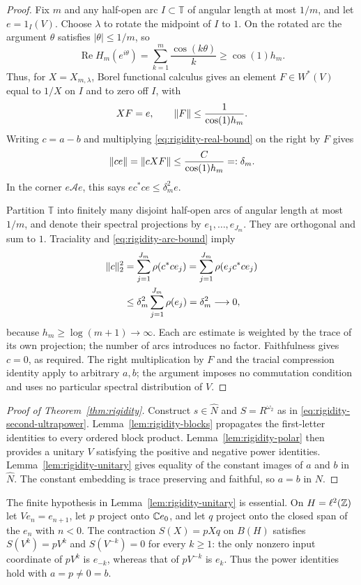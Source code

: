 \begin{proof}
Fix $m$ and any half-open arc $I\subset\mathbb T$ of angular length
at most $1/m$, and let $e=1_I(V)$.  Choose $\lambda$ to rotate the
midpoint of $I$ to $1$.  On the rotated arc the argument $\theta$
satisfies $|\theta|\leq1/m$, so
\[
 \operatorname{Re}H_m(e^{i\theta})
 =\sum_{k=1}^m\frac{\cos(k\theta)}k
 \geq\cos(1)h_m.
\]
Thus, for $X=X_{m,\lambda}$, Borel functional calculus gives an
element $F\in W^*(V)$ equal to $1/X$ on $I$ and to zero off $I$,
with
\[
 XF=e,\qquad
 \lVert F\rVert\leq\frac1{\cos(1)h_m}.
\]
Writing $c=a-b$ and multiplying \eqref{eq:rigidity-real-bound} on
the right by $F$ gives
\begin{equation}\label{eq:rigidity-arc-bound}
 \lVert ce\rVert=\lVert cXF\rVert
 \leq\frac{C}{\cos(1)h_m}=:\delta_m.
\end{equation}
In the corner $e\mathcal A e$, this says
$ec^*ce\leq\delta_m^2 e$.

Partition $\mathbb T$ into finitely many disjoint half-open arcs of
angular length at most $1/m$, and denote their spectral projections
by $e_1,\ldots,e_{J_m}$.  They are orthogonal and sum to $1$.
Traciality and \eqref{eq:rigidity-arc-bound} imply
\[
 \begin{split}
 \lVert c\rVert_2^2
 &=\sum_{j=1}^{J_m}\rho(c^*ce_j)
  =\sum_{j=1}^{J_m}\rho(e_jc^*ce_j)\\
 &\leq\delta_m^2\sum_{j=1}^{J_m}\rho(e_j)
  =\delta_m^2\longrightarrow0,
 \end{split}
\]
because $h_m\geq\log(m+1)\to\infty$.  Each arc estimate is weighted
by the trace of its own projection; the number of arcs introduces no
factor.  Faithfulness gives $c=0$, as required.  The right multiplication
by $F$ and the tracial compression identity apply to arbitrary $a,b$;
the argument imposes no commutation condition and uses no particular
spectral distribution of $V$.
\end{proof}

\begin{proof}[Proof of Theorem~\ref{thm:rigidity}]
Construct $s\in\widehat N$ and $S=R^{\omega_2}$ as in
\eqref{eq:rigidity-second-ultrapower}.
Lemma~\ref{lem:rigidity-blocks} propagates the first-letter identities
to every ordered block product.  Lemma~\ref{lem:rigidity-polar} then
provides a unitary $V$ satisfying the positive and negative power
identities.  Lemma~\ref{lem:rigidity-unitary} gives equality of the
constant images of $a$ and $b$ in $\widehat N$.  The constant embedding
is trace preserving and faithful, so $a=b$ in $N$.
\end{proof}

\begin{remark}\label{rem:finite-trace-essential}
The finite hypothesis in Lemma~\ref{lem:rigidity-unitary} is essential.
On $H=\ell^2(\mathbb Z)$ let $Ve_n=e_{n+1}$, let $p$ project onto $\mathbb C e_0$,
and let $q$ project onto the closed span of the $e_n$ with $n<0$.
The contraction $S(X)=pXq$ on $B(H)$ satisfies
$S(V^k)=pV^k$ and $S(V^{-k})=0$ for every $k\ge1$:
the only nonzero input coordinate of $pV^k$ is $e_{-k}$, whereas
that of $pV^{-k}$ is $e_k$.
Thus the power identities hold with $a=p\ne0=b$.
\end{remark}
